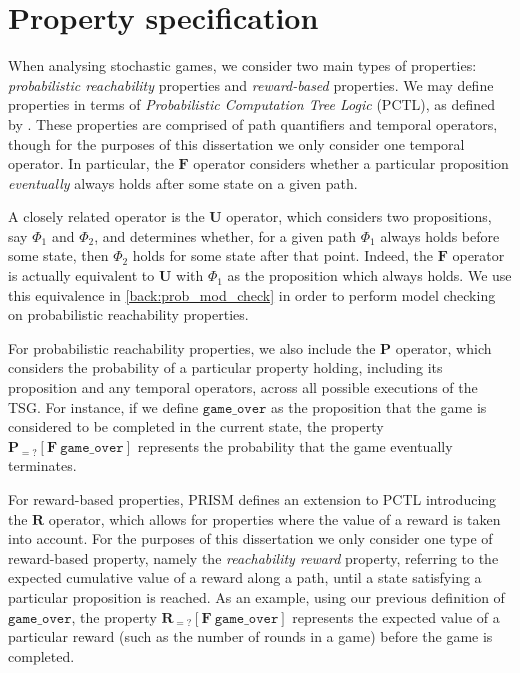 \section{Property specification}
\label{back:prop_spec}

When analysing stochastic games, we consider two main types of properties: \emph{probabilistic reachability} properties and \emph{reward-based} properties. We may define properties in terms of \emph{Probabilistic Computation Tree Logic} (PCTL), as defined by \cite{hansson_logic_1994}. These properties are comprised of path quantifiers and temporal operators, though for the purposes of this dissertation we only consider one temporal operator. In particular, the $\mathbf{F}$ operator considers whether a particular proposition \emph{eventually} always holds after some state on a given path.

A closely related operator is the $\mathbf{U}$ operator, which considers two propositions, say $\Phi_1$ and $\Phi_2$, and determines whether, for a given path $\Phi_1$ always holds before some state, then $\Phi_2$ holds for some state after that point. Indeed, the $\mathbf{F}$ operator is actually equivalent to $\mathbf{U}$ with $\Phi_1$ as the proposition which always holds. We use this equivalence in \ref{back:prob_mod_check} in order to perform model checking on probabilistic reachability properties.

For probabilistic reachability properties, we also include the $\mathbf{P}$ operator, which considers the probability of a particular property holding, including its proposition and any temporal operators, across all possible executions of the TSG. For instance, if we define $\mathtt{game\_over}$ as the proposition that the game is considered to be completed in the current state, the property $\mathbf{P}_{=?} [\mathbf{F}\ \mathtt{game\_over}]$ represents the probability that the game eventually terminates.

For reward-based properties, PRISM defines an extension to PCTL introducing the $\mathbf{R}$ operator, which allows for properties where the value of a reward is taken into account. For the purposes of this dissertation we only consider one type of reward-based property, namely the \emph{reachability reward} property, referring to the expected cumulative value of a reward along a path, until a state satisfying a particular proposition is reached. As an example, using our previous definition of $\mathtt{game\_over}$, the property $\mathbf{R}_{=?} [\mathbf{F}\ \mathtt{game\_over}]$ represents the expected value of a particular reward (such as the number of rounds in a game) before the game is completed.

